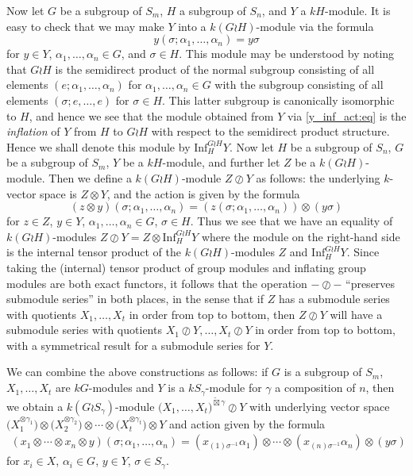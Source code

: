 Now let $G$ be a subgroup of $S_m$, $H$ a subgroup of $S_n$, and $Y$ a $kH$-module. It is easy to check that we may make $Y$ into a
$k(G{\wr}H)$-module via the formula
\begin{equation}\label{y_inf_act:eq}
y(\sigma;\alpha_1,\ldots,\alpha_n) = y\sigma
\end{equation}
for $y \in Y$, $\alpha_1,\ldots,\alpha_n \in G$, and $\sigma \in H$. This module may be understood by noting that $G{\wr}H$ is the
semidirect product of the normal subgroup consisting of all elements $(e;\alpha_1,\ldots,\alpha_n)$ for $\alpha_1,\ldots,\alpha_n \in G$
with the subgroup consisting of all elements $(\sigma;e,\ldots,e)$ for $\sigma \in H$. This latter subgroup is canonically isomorphic to
$H$, and hence we see that the module obtained from $Y$ via \eqref{y_inf_act:eq} is the \textit{inflation} of $Y$ from $H$ to $G{\wr}H$
with respect to the semidirect product
structure. Hence we shall denote this module by $\mathrm{Inf}^{G{\wr}H}_H Y$.
Now let $H$ be a subgroup of $S_n$, $G$ be a subgroup of $S_m$, $Y$ be a $kH$-module, and further let $Z$ be a $k(G{\wr}H)$-module. Then
we define a $k(G{\wr}H)$-module $Z{\oslash}Y$ as follows: the underlying $k$-vector space is $Z{\otimes}Y$, and
the action is given by the formula
\[(z \otimes y)(\sigma;\alpha_1,\ldots,\alpha_n) = (z(\sigma;\alpha_1,\ldots,\alpha_n))\otimes(y\sigma)\]
for $z \in Z$, $y \in Y$, $\alpha_1,\ldots,\alpha_n \in G$, $\sigma \in H$.
Thus we see that we have an equality of $k(G{\wr}H)$-modules $Z{\oslash}Y = Z \otimes \mathrm{Inf}^{G{\wr}H}_H Y$
where the module on the right-hand side is the internal tensor product of the $k(G{\wr}H)$-modules $Z$ and $\mathrm{Inf}^{G{\wr}H}_H Y$.
Since taking the (internal) tensor product of group modules and inflating group modules are both exact functors, it follows that the
operation $- \oslash -$ ``preserves submodule series'' in both places, in the sense that if $Z$ has a submodule series with quotients
$X_1,\ldots,X_t$ in order from top to bottom, then $Z \oslash Y$ will have a submodule series with quotients $X_1 \oslash Y, \ldots,
X_t \oslash Y$ in order from top to bottom, with a symmetrical result for a submodule series for $Y$.

We can combine the above constructions as follows: if $G$ is a subgroup of $S_m$, $X_1,\ldots,X_t$ are $kG$-modules and $Y$ is a
$kS_{\gamma}$-module for $\gamma$ a composition of $n$, then we obtain a $k(G{\wr}S_{\gamma})$-module
$\bigl(X_1,\ldots,X_t\bigr)^{\widetilde\boxtimes\gamma}{\oslash}Y$
with underlying vector space
$\bigl(X^{\otimes \gamma_1}_1\bigr)\otimes\bigl(X^{\otimes \gamma_2}_2\bigr)\otimes\cdots\otimes\bigl(X^{\otimes \gamma_t}_t\bigr){\otimes}Y$
and action given by the formula
\begin{multline}\label{xs_twid_osl_y_act:eq}
	(x_1{\otimes}\cdots{\otimes}x_n{\otimes}y)(\sigma;\alpha_1,\ldots,\alpha_n) =
	(x_{(1)\sigma^{-1}}\alpha_1)\otimes\cdots\otimes(x_{(n)\sigma^{-1}}\alpha_n){\otimes}(y\sigma)
\end{multline}
for $x_i \in X$, $\alpha_i \in G$, $y \in Y$, $\sigma \in S_{\gamma}$.


